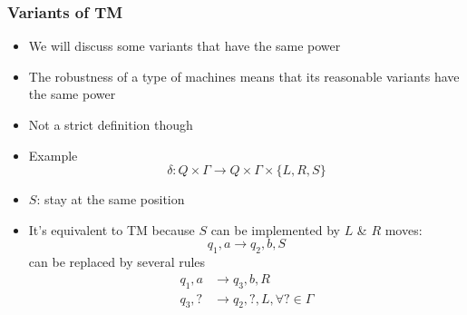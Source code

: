 




\begin{frame}[allowframebreaks] \frametitle{Variants of TM}
  \begin{itemize}
\item We will discuss some variants that have the same power

\item
  The robustness of a type of machines means that its reasonable
variants have the same 
power

\item
  [] Not a strict definition though

\item Example
  \begin{equation*}
\delta: Q \times \Gamma\rightarrow Q \times \Gamma 
\times \{L, R, S\}
\end{equation*}
\item
  [] $S$: stay at the same position

\item
  It's equivalent to TM because $S$ can
  be implemented by $L$ \& $R$ moves:
  \begin{equation*}
      q_1,a \rightarrow q_2,b, S
    \end{equation*}
    can be replaced by several rules
    \begin{align*}
q_1,a &\rightarrow q_3, b,R \\
q_3, ? &\rightarrow q_2, ?, L, \forall ? \in \Gamma 
\end{align*}
\end{itemize}
\end{frame}

